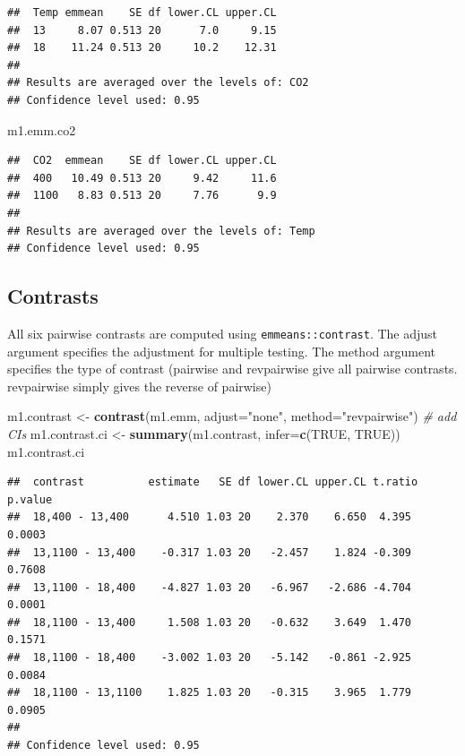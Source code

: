 \documentclass[]{book}
\newenvironment{Shaded}{\begin{snugshade}}{\end{snugshade}}
\newcommand{\KeywordTok}[1]{\textcolor[rgb]{0.13,0.29,0.53}{\textbf{#1}}}
\newcommand{\DataTypeTok}[1]{\textcolor[rgb]{0.13,0.29,0.53}{#1}}
\newcommand{\StringTok}[1]{\textcolor[rgb]{0.31,0.60,0.02}{#1}}
\newcommand{\CommentTok}[1]{\textcolor[rgb]{0.56,0.35,0.01}{\textit{#1}}}
\newcommand{\OtherTok}[1]{\textcolor[rgb]{0.56,0.35,0.01}{#1}}
\newcommand{\NormalTok}[1]{#1}
\begin{document}
\begin{verbatim}
##  Temp emmean    SE df lower.CL upper.CL
##  13     8.07 0.513 20      7.0     9.15
##  18    11.24 0.513 20     10.2    12.31
## 
## Results are averaged over the levels of: CO2 
## Confidence level used: 0.95
\end{verbatim}

\begin{Shaded}
\begin{Highlighting}[]
\NormalTok{m1.emm.co2}
\end{Highlighting}
\end{Shaded}

\begin{verbatim}
##  CO2  emmean    SE df lower.CL upper.CL
##  400   10.49 0.513 20     9.42     11.6
##  1100   8.83 0.513 20     7.76      9.9
## 
## Results are averaged over the levels of: Temp 
## Confidence level used: 0.95
\end{verbatim}

\subsection{Contrasts}\label{contrasts}

All six pairwise contrasts are computed using
\texttt{emmeans::contrast}. The adjust argument specifies the adjustment
for multiple testing. The method argument specifies the type of contrast
(pairwise and revpairwise give all pairwise contrasts. revpairwise
simply gives the reverse of pairwise)

\begin{Shaded}
\begin{Highlighting}[]
\NormalTok{m1.contrast <-}\StringTok{ }\KeywordTok{contrast}\NormalTok{(m1.emm, }\DataTypeTok{adjust=}\StringTok{"none"}\NormalTok{, }\DataTypeTok{method=}\StringTok{"revpairwise"}\NormalTok{)}
\CommentTok{# add CIs}
\NormalTok{m1.contrast.ci <-}\StringTok{ }\KeywordTok{summary}\NormalTok{(m1.contrast, }\DataTypeTok{infer=}\KeywordTok{c}\NormalTok{(}\OtherTok{TRUE}\NormalTok{, }\OtherTok{TRUE}\NormalTok{))}
\NormalTok{m1.contrast.ci}
\end{Highlighting}
\end{Shaded}

\begin{verbatim}
##  contrast          estimate   SE df lower.CL upper.CL t.ratio p.value
##  18,400 - 13,400      4.510 1.03 20    2.370    6.650  4.395  0.0003 
##  13,1100 - 13,400    -0.317 1.03 20   -2.457    1.824 -0.309  0.7608 
##  13,1100 - 18,400    -4.827 1.03 20   -6.967   -2.686 -4.704  0.0001 
##  18,1100 - 13,400     1.508 1.03 20   -0.632    3.649  1.470  0.1571 
##  18,1100 - 18,400    -3.002 1.03 20   -5.142   -0.861 -2.925  0.0084 
##  18,1100 - 13,1100    1.825 1.03 20   -0.315    3.965  1.779  0.0905 
## 
## Confidence level used: 0.95
\end{verbatim}
\end{document}
